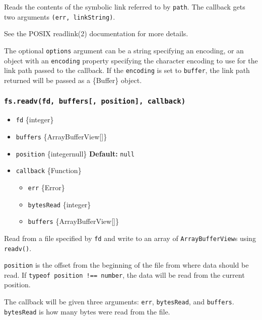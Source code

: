 Reads the contents of the symbolic link referred to by \texttt{path}.
The callback gets two arguments \texttt{(err,\ linkString)}.

See the POSIX readlink(2) documentation for more details.

The optional \texttt{options} argument can be a string specifying an
encoding, or an object with an \texttt{encoding} property specifying the
character encoding to use for the link path passed to the callback. If
the \texttt{encoding} is set to
\texttt{\textquotesingle{}buffer\textquotesingle{}}, the link path
returned will be passed as a \{Buffer\} object.

\subsubsection{\texorpdfstring{\texttt{fs.readv(fd,\ buffers{[},\ position{]},\ callback)}}{fs.readv(fd, buffers{[}, position{]}, callback)}}\label{fs.readvfd-buffers-position-callback}

\begin{itemize}
\tightlist
\item
  \texttt{fd} \{integer\}
\item
  \texttt{buffers} \{ArrayBufferView{[}{]}\}
\item
  \texttt{position} \{integer\textbar null\} \textbf{Default:}
  \texttt{null}
\item
  \texttt{callback} \{Function\}

  \begin{itemize}
  \tightlist
  \item
    \texttt{err} \{Error\}
  \item
    \texttt{bytesRead} \{integer\}
  \item
    \texttt{buffers} \{ArrayBufferView{[}{]}\}
  \end{itemize}
\end{itemize}

Read from a file specified by \texttt{fd} and write to an array of
\texttt{ArrayBufferView}s using \texttt{readv()}.

\texttt{position} is the offset from the beginning of the file from
where data should be read. If
\texttt{typeof\ position\ !==\ \textquotesingle{}number\textquotesingle{}},
the data will be read from the current position.

The callback will be given three arguments: \texttt{err},
\texttt{bytesRead}, and \texttt{buffers}. \texttt{bytesRead} is how many
bytes were read from the file.

